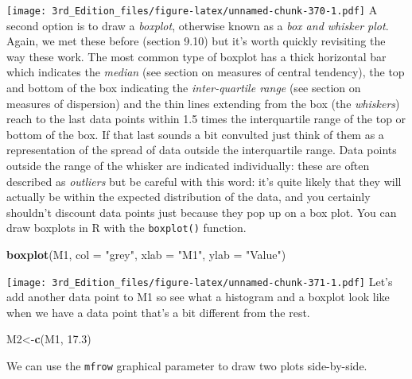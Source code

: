 \documentclass[
]{book}
\newenvironment{Shaded}{\begin{snugshade}}{\end{snugshade}}
\newcommand{\DataTypeTok}[1]{\textcolor[rgb]{0.13,0.29,0.53}{#1}}
\newcommand{\FloatTok}[1]{\textcolor[rgb]{0.00,0.00,0.81}{#1}}
\newcommand{\KeywordTok}[1]{\textcolor[rgb]{0.13,0.29,0.53}{\textbf{#1}}}
\newcommand{\NormalTok}[1]{#1}
\newcommand{\StringTok}[1]{\textcolor[rgb]{0.31,0.60,0.02}{#1}}
\begin{document}
\texttt{[image: 3rd\_Edition\_files/figure-latex/unnamed-chunk-370-1.pdf]}
A second option is to draw a \emph{boxplot}, otherwise known as a \emph{box and whisker plot}. Again, we met these before (section 9.10) but it's worth quickly revisiting the way these work. The most common type of boxplot has a thick horizontal bar which indicates the \emph{median} (see section on measures of central tendency), the top and bottom of the box indicating the \emph{inter-quartile range} (see section on measures of dispersion) and the thin lines extending from the box (the \emph{whiskers}) reach to the last data points within 1.5 times the interquartile range of the top or bottom of the box. If that last sounds a bit convulted just think of them as a representation of the spread of data outside the interquartile range. Data points outside the range of the whisker are indicated individually: these are often described as \emph{outliers} but be careful with this word: it's quite likely that they will actually be within the expected distribution of the data, and you certainly shouldn't discount data points just because they pop up on a box plot. You can draw boxplots in R with the \texttt{boxplot()} function.

\begin{Shaded}
\begin{Highlighting}[]
\KeywordTok{boxplot}\NormalTok{(M1,}
        \DataTypeTok{col =} \StringTok{"grey"}\NormalTok{,}
        \DataTypeTok{xlab =} \StringTok{"M1"}\NormalTok{,}
        \DataTypeTok{ylab =} \StringTok{"Value"}\NormalTok{)}
\end{Highlighting}
\end{Shaded}

\texttt{[image: 3rd\_Edition\_files/figure-latex/unnamed-chunk-371-1.pdf]}
Let's add another data point to M1 so see what a histogram and a boxplot look like when we have a data point that's a bit different from the rest.

\begin{Shaded}
\begin{Highlighting}[]
\NormalTok{M2<-}\KeywordTok{c}\NormalTok{(M1, }\FloatTok{17.3}\NormalTok{)}
\end{Highlighting}
\end{Shaded}

We can use the \texttt{mfrow} graphical parameter to draw two plots side-by-side.
\end{document}
